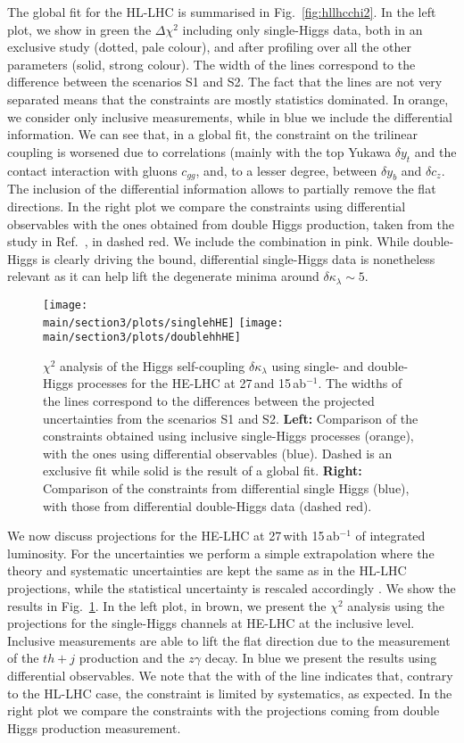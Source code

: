 The global fit for the HL-LHC is summarised in Fig.~\ref{fig:hllhcchi2}. In the left plot, we show in green the $\Delta\chi^2$ including only single-Higgs data, both in an exclusive study (dotted, pale colour), and after profiling over all the other parameters (solid, strong colour). The width of the lines correspond to the difference between the scenarios S1 and S2. The fact that the lines are not very separated means that the constraints are mostly statistics dominated. In orange, we consider only inclusive measurements, while in blue we include the differential information. We can see that, in a global fit, the constraint on the trilinear coupling is worsened due to correlations (mainly with the top Yukawa $\delta y_t$ and the contact interaction with gluons $c_{gg}$, and, to a lesser degree, between $\delta y_b$ and $\delta c_z$. The inclusion of the differential information allows to partially remove the flat directions. In the right plot we compare the constraints using differential observables with the ones obtained from double Higgs production, taken from the study in Ref.~\cite{Azatov:2015oxa}, in dashed red. We include the combination in pink. While double-Higgs is clearly driving the bound, differential single-Higgs data is nonetheless relevant as it can help lift the degenerate minima around $\delta \kappa_\lambda\sim 5$.
\medskip

\begin{figure}
	\centering
	\texttt{[image: \\main/section3/plots/singlehHE]}\hfill
	\texttt{[image: \\main/section3/plots/doublehhHE]}
	\caption{$\chi^2$ analysis of the Higgs self-coupling $\delta \kappa_\lambda$ using single- and double-Higgs processes for the HE-LHC at 27\,\UTeV and 15\,ab$^{-1}$. The widths of the lines correspond to the differences between the projected uncertainties from the scenarios S1 and S2. \textbf{Left:} Comparison of the constraints obtained using inclusive single-Higgs processes (orange), with the ones using differential observables (blue). Dashed is an exclusive fit while solid is the result of a global fit. \textbf{Right:} Comparison of the constraints from differential single Higgs (blue), with those from differential double-Higgs data (dashed red).}
	\label{fig:helhcchi2}
\end{figure}	


We now discuss projections for the HE-LHC at 27\,\UTeV with 15\,ab$^{-1}$ of integrated luminosity. For the uncertainties we perform a simple extrapolation where the theory and systematic uncertainties are kept the same as in the HL-LHC projections, while the statistical uncertainty is rescaled accordingly \cite{Goncalves:2018qas}. We show the results in Fig.~\ref{fig:helhcchi2}. In the left plot, in brown, we present the $\chi^2$ analysis using the projections for the single-Higgs channels at HE-LHC at the inclusive level. Inclusive measurements are able to lift the flat direction due to the measurement of the $th+j$ production and the $z\gamma$ decay. In blue we present the results using differential observables. We note that the with of the line indicates that, contrary to the HL-LHC case, the constraint is limited by systematics, as expected. In the right plot we compare the constraints with the projections coming from double Higgs production measurement.
\medskip